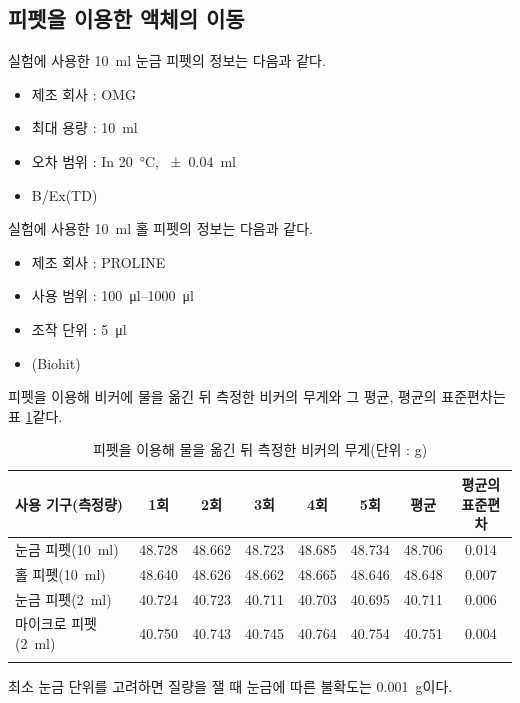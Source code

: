 \documentclass{GSHS-chemexp}
\begin{document}
	
	\subsection{피펫을 이용한 액체의 이동} \label{sbsec:pip}
	실험에 사용한 \SI{10}{\milli\litre} 눈금 피펫의 정보는 다음과 같다.
	\begin{itemize}
		\item 제조 회사 : OMG
		\item 최대 용량 : \SI{10}{\milli\litre}
		\item 오차 범위 :
		In \SI{20}{\degreeCelsius}, \SI{+-0.04}{\milli\litre}
		\item B/Ex(TD)
	\end{itemize}
	
	실험에 사용한 \SI{10}{\milli\litre} 홀 피펫의 정보는 다음과 같다.
	\begin{itemize}
		\item 제조 회사 : PROLINE
		\item 사용 범위 : \SIrange{100}{1000}{\micro\litre}
		\item 조작 단위 : \SI{5}{\micro\litre}
		\item (Biohit)
	\end{itemize}
	
	피펫을 이용해 비커에 물을 옮긴 뒤 측정한 비커의 무게와 그 평균,
	평균의 표준편차는 표 \ref{tab:data1}\과 같다.
	\begin{table}[H]
		\centering
		\begin{tabular}{l c c c c c c c}
			\thickhline
			사용 기구(측정량) & 1회 & 2회 & 3회 & 4회 & 5회 &
			평균 & \makecell{평균의\\표준편차} \\
			\hline
			눈금 피펫(\SI{10}{\milli\litre}) &
			48.728 & 48.662 & 48.723 & 48.685 &
			48.734 & 48.706 & 0.014 \\
			홀 피펫(\SI{10}{\milli\litre})&
			48.640 & 48.626 & 48.662 & 48.665 &
			48.646 & 48.648 & 0.007 \\
			눈금 피펫(\SI{2}{\milli\litre}) &
			40.724 & 40.723 & 40.711 & 40.703 &
			40.695 & 40.711 & 0.006 \\
			마이크로 피펫(\SI{2}{\milli\litre}) &
			40.750 & 40.743 & 40.745 & 40.764 &
			40.754 & 40.751 & 0.004 \\
			\thickhline
		\end{tabular}
		\caption{피펫을 이용해 물을 옮긴 뒤 측정한
			비커의 무게(단위 : \si{\gram})}
		\label{tab:data1}
	\end{table}

	최소 눈금 단위를 고려하면 질량을 잴 때
	눈금에 따른 불확도는 \SI{0.001}{\gram}이다.
	
\end{document}
